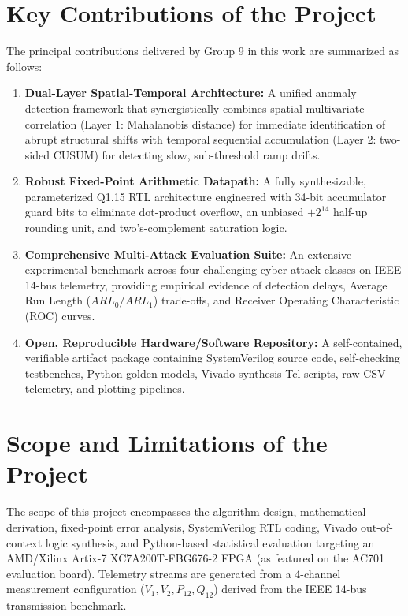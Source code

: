 \documentclass[12pt,a4paper]{report}
\begin{document}
\section{Key Contributions of the Project}
The principal contributions delivered by Group 9 in this work are summarized as follows:
\begin{enumerate}
    \item \textbf{Dual-Layer Spatial-Temporal Architecture:} A unified anomaly detection
    framework that synergistically combines spatial multivariate correlation (Layer 1:
    Mahalanobis distance) for immediate identification of abrupt structural shifts with
    temporal sequential accumulation (Layer 2: two-sided CUSUM) for detecting slow,
    sub-threshold ramp drifts.
    \item \textbf{Robust Fixed-Point Arithmetic Datapath:} A fully synthesizable,
    parameterized Q1.15 RTL architecture engineered with 34-bit accumulator guard bits
    to eliminate dot-product overflow, an unbiased $+2^{14}$ half-up rounding unit, and
    two's-complement saturation logic.
    \item \textbf{Comprehensive Multi-Attack Evaluation Suite:} An extensive experimental
    benchmark across four challenging cyber-attack classes on IEEE 14-bus telemetry,
    providing empirical evidence of detection delays, Average Run Length ($ARL_0/ARL_1$)
    trade-offs, and Receiver Operating Characteristic (ROC) curves.
    \item \textbf{Open, Reproducible Hardware/Software Repository:} A self-contained,
    verifiable artifact package containing SystemVerilog source code, self-checking
    testbenches, Python golden models, Vivado synthesis Tcl scripts, raw CSV telemetry,
    and plotting pipelines.
\end{enumerate}

\section{Scope and Limitations of the Project}
The scope of this project encompasses the algorithm design, mathematical derivation,
fixed-point error analysis, SystemVerilog RTL coding, Vivado out-of-context logic
synthesis, and Python-based statistical evaluation targeting an AMD/Xilinx Artix-7
XC7A200T-FBG676-2 FPGA (as featured on the AC701 evaluation board). Telemetry streams
are generated from a 4-channel measurement configuration ($V_1, V_2, P_{12}, Q_{12}$)
derived from the IEEE 14-bus transmission benchmark.
\end{document}
